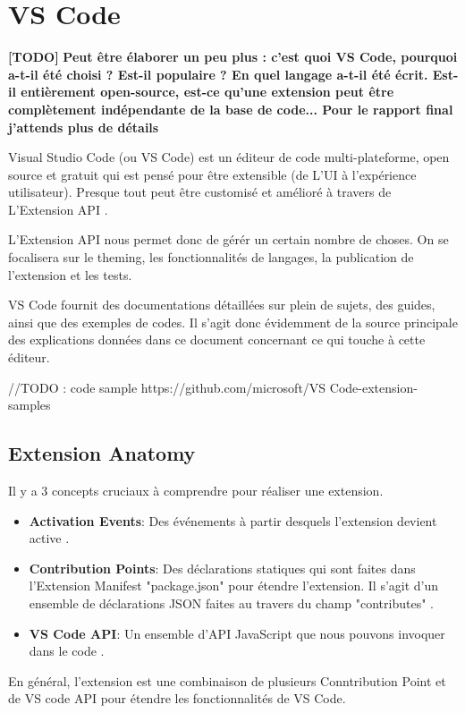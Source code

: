 \documentclass[
    iict, %
    il, %
]{heig-tb}
\begin{document}
\section{VS Code}
\textbf{[TODO]}
\textbf{Peut être élaborer un peu plus : c'est quoi VS Code, pourquoi a-t-il été choisi ? Est-il populaire ? En quel langage a-t-il été écrit. Est-il entièrement open-source, est-ce qu'une extension peut être complètement indépendante de la base de code...
    Pour le rapport final j'attends plus de détails}


Visual Studio Code (ou VS Code) est un éditeur de code multi-plateforme, open source et gratuit qui est pensé pour être extensible (de L'UI à l'expérience utilisateur).
Presque tout peut être customisé et amélioré à travers de L'Extension API \cite{extension-api}.

L'Extension API nous permet donc de gérér un certain nombre de choses.
On se focalisera sur le theming, les fonctionnalités de langages, la publication de l'extension et les tests.

VS Code fournit des documentations détaillées sur plein de sujets, des guides, ainsi que des exemples de codes.
Il s'agit donc évidemment de la source principale des explications données dans ce document concernant ce qui touche à cette éditeur.

//TODO : code sample https://github.com/microsoft/VS Code-extension-samples

\subsection{Extension Anatomy}
Il y a 3 concepts cruciaux à comprendre pour réaliser une extension.

\begin{itemize}
    \item \textbf{Activation Events}: Des événements à partir desquels l'extension devient active \cite{activation-events}.
    \item \textbf{Contribution Points}: Des déclarations statiques qui sont faites dans l'Extension Manifest "package.json" pour étendre l'extension. Il s'agit d'un ensemble de déclarations JSON faites au travers du champ "contributes" \cite{contribution-points}.
    \item \textbf{VS Code API}: Un ensemble d'API JavaScript que nous pouvons invoquer dans le code \cite{vs-code-api}.
\end{itemize}

En général, l'extension est une combinaison de plusieurs Conntribution Point et de VS code API pour étendre les fonctionnalités de VS Code.
\end{document}
